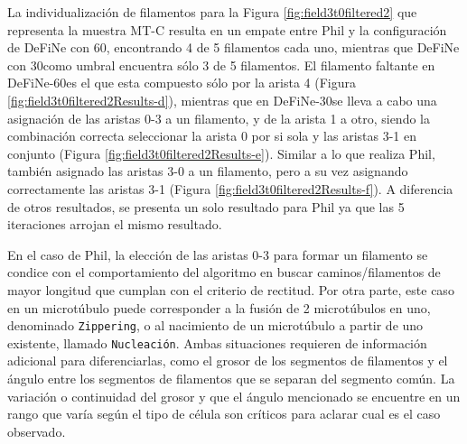 
La individualizaci\'on de filamentos para la Figura \ref{fig:field3t0filtered2} que representa la muestra MT-C resulta en un empate entre Phil y la configuraci\'on de DeFiNe con 60\textdegree, encontrando 4 de 5 filamentos cada uno, mientras que DeFiNe con 30\textdegree como umbral encuentra s\'olo 3 de 5 filamentos. El filamento faltante en DeFiNe-60\textdegree es el que esta compuesto s\'olo por la arista 4 (Figura \ref{fig:field3t0filtered2Results-d}), mientras que en DeFiNe-30\textdegree se lleva a cabo una asignaci\'on de las aristas 0-3 a un filamento, y de la arista 1 a otro, siendo la combinaci\'on correcta seleccionar la arista 0 por si sola y las aristas 3-1 en conjunto (Figura \ref{fig:field3t0filtered2Results-e}). Similar a lo que realiza Phil, tambi\'en asignado las aristas 3-0 a un filamento, pero a su vez asignando correctamente las aristas 3-1 (Figura \ref{fig:field3t0filtered2Results-f}).  A diferencia de otros resultados, se presenta un solo resultado para Phil ya que las 5 iteraciones arrojan el mismo resultado.


En el caso de Phil, la elecci\'on de las aristas 0-3 para formar un filamento se condice con el comportamiento del algoritmo en buscar caminos/filamentos de mayor longitud que cumplan con el criterio de rectitud. Por otra parte, este caso en un microt\'ubulo puede corresponder a la fusi\'on de 2 microt\'ubulos en uno, denominado {\tt Zippering}, o al nacimiento de un microt\'ubulo a partir de uno existente, llamado {\tt Nucleaci\'on}. Ambas situaciones requieren de informaci\'on adicional para diferenciarlas, como el grosor de los segmentos de filamentos y el \'angulo entre los segmentos de filamentos que se separan del segmento com\'un. La variaci\'on o continuidad del grosor y que el \'angulo mencionado se encuentre en un rango que var\'ia seg\'un el tipo de c\'elula son cr\'iticos para aclarar cual es el caso observado. 


